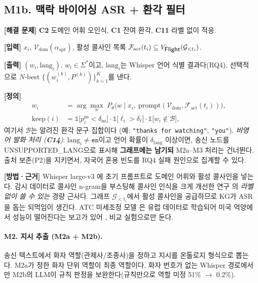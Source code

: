 \documentclass[10pt,a4paper]{article}
\newcommand{\G}{\mathcal{G}}
\newcommand{\Vdom}{\mathcal{V}_{\mathrm{dom}}}
\newcommand{\cmd}[1]{\textsf{\small #1}}
\newcommand{\ch}[1]{\textbf{\textcolor{red!60!black}{#1}}}
\begin{document}
\subsection{M1b. 맥락 바이어싱 ASR + 환각 필터}
\textbf{[해결 문제]} \ch{C2} 도메인 어휘 오인식, \ch{C1} 잔여 환각, \ch{C11} 라벨 없이 적응.

\textbf{[입력]} $x_i$, $\Vdom(\alpha_{\mathrm{apt}})$, 활성 콜사인 목록 $\mathcal{F}_{\mathrm{act}}(t_i) \subseteq V_{\cmd{Flight}}(\G_{<t_i})$.

\textbf{[출력]} $(w_i, \mathrm{lang}_i)$. $w_i\in\Sigma^*$이고, $\mathrm{lang}_i$는 Whisper 언어 식별 결과다(RQ4). 선택적으로 $N$-best $\{(w_i^{(k)},P^{(k)})\}_{k=1}^{K}$를 낸다.

\textbf{[정의]}
\begin{align}
w_i &= \arg\max_{w}\; P_\theta\big(w \mid x_i,\ \mathrm{prompt}(\Vdom,\mathcal{F}_{\mathrm{act}}(t_i))\big),\\
\mathrm{keep}(i) &= \mathbb{1}\big[p^{\mathrm{ns}}_i < \delta_{\mathrm{ns}}\big]\cdot\mathbb{1}\big[\bar\ell_i > \delta_{\ell}\big]\cdot\mathbb{1}\big[w_i\notin\mathcal{B}\big],
\end{align}
여기서 $\mathcal{B}$는 알려진 환각 문구 집합이다 (예: \texttt{"thanks for watching"}, \texttt{"you"}).
\emph{비영어 발화 처리 (\ch{C14})}: $\mathrm{lang}_i\neq\texttt{en}$이고 언어 확률이 $\delta_{\mathrm{lang}}$ 이상이면, 송신 노드를 \cmd{UNSUPPORTED\_LANG}으로 표시해 \textbf{그래프에는 남기되} M2a--M3 처리는 건너뛴다. 출처 보존(P2)을 지키면서, 자국어 혼용 빈도를 RQ4 실패 원인으로 집계할 수 있다.

\textbf{[방법·근거]} Whisper large-v3 \cite{whisper}에 초기 프롬프트로 도메인 어휘와 활성 콜사인을 넣는다. 감시 데이터로 콜사인 n-gram을 부스팅해 콜사인 인식을 크게 개선한 연구 \cite{nigmatulina2022}의 \emph{라벨 없이 쓸 수 있는} 경량 근사다. 그래프 $\G_{<t_i}$에서 활성 콜사인을 공급하므로 KG가 ASR을 돕는 되먹임이 생긴다. ATC 미세조정 모델 \cite{vandoorn}은 유럽 데이터로 학습되어 미국 억양에서 성능이 떨어진다는 보고가 있어 \cite{usatc2025}, 비교 실험으로만 둔다.

\paragraph{M2. 지시 추출 (M2a + M2b).} 송신 텍스트에서 화자 역할(관제사/조종사)을 정하고 지시를 온톨로지 형식으로 뽑는다. M2a가 정한 화자 단위 역할이 최종 역할이다. 화자 번호가 없는 Whisper 경로에서만 M2b의 LLM이 규칙 판정을 보완한다(규칙만으로 역할 미정 51\% $\to$ 0.2\%).
\end{document}
